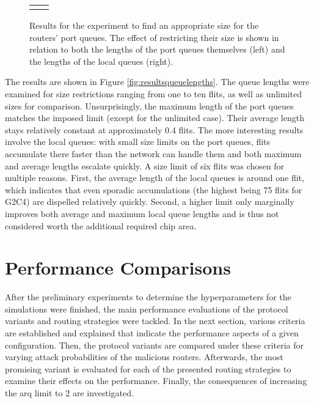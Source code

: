 \begin{figure}
    \centering
    \begin{tabular}{cc}
         & 
    \end{tabular}
    \caption[Results for the port queue sizes experiment]{Results for the experiment to find an appropriate size for the routers' port queues. The
    effect of restricting their size is shown in relation to both the lengths of the port queues themselves (left) and the lengths of the local queues
    (right).}
    \label{fig:resultsqueuelengths}
\end{figure}

The results are shown in Figure \vref{fig:resultsqueuelengths}. The queue lengths were examined for size restrictions ranging from one to ten flits,
as well as unlimited sizes for comparison. Unsurprisingly, the maximum length of the port queues matches the imposed limit (except for the unlimited
case). Their average length stays relatively constant at approximately 0.4 flits. The more interesting results involve the local queues: with small
size limits on the port queues, flits accumulate there faster than the network can handle them and both maximum and average lengths escalate quickly.
A size limit of six flits was chosen for multiple reasons. First, the average length of the local queues is around one flit, which indicates that even
sporadic accumulations (the highest being 75 flits for G2C4) are dispelled relatively quickly. Second, a higher limit only marginally improves both
average and maximum local queue lengths and is thus not considered worth the additional required chip area.

\section{Performance Comparisons}\label{sec:perfcompeval}
After the preliminary experiments to determine the hyperparameters for the simulations were finished, the main performance evaluations of the protocol
variants and routing strategies were tackled. In the next section, various criteria are established and explained that indicate the performance aspects
of a given configuration. Then, the protocol variants are compared under these criteria for varying attack probabilities of the malicious routers.
Afterwards, the most promising variant is evaluated for each of the presented routing strategies to examine their effects on the performance. Finally,
the consequences of increasing the \gls{arq} limit to 2 are investigated.

